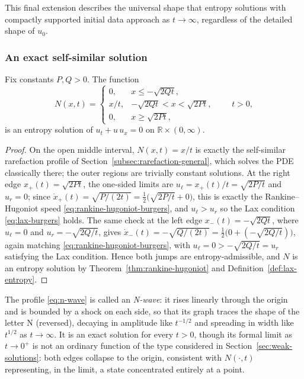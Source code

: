 This final extension describes the universal shape that entropy
solutions with compactly supported initial data approach as $t \to
\infty$, regardless of the detailed shape of $u_0$.

\subsubsection{An exact self-similar solution}
\label{subsubsec:n-wave-exact}

\begin{proposition}
\label{prop:n-wave-exact}
Fix constants $P, Q > 0$. The function
\begin{equation}
  \label{eq:n-wave}
  N(x,t) = \begin{cases}
    0, & x \le -\sqrt{2Qt}, \\
    x/t, & -\sqrt{2Qt} < x < \sqrt{2Pt}, \\
    0, & x \ge \sqrt{2Pt},
  \end{cases}
  \qquad t>0,
\end{equation}
is an entropy solution of $u_t+u\,u_x=0$ on $\mathbb{R}\times(0,\infty)$.
\end{proposition}

\begin{proof}
On the open middle interval, $N(x,t)=x/t$ is exactly the self-similar
rarefaction profile of Section~\ref{subsec:rarefaction-general}, which
solves the PDE classically there; the outer regions are trivially
constant solutions. At the right edge $x_+(t)=\sqrt{2Pt}$, the one-sided
limits are $u_\ell = x_+(t)/t = \sqrt{2P/t}$ and $u_r=0$; since
$\dot x_+(t) = \sqrt{P/(2t)} = \tfrac12\big(\sqrt{2P/t}+0\big)$, this is
exactly the Rankine--Hugoniot speed \eqref{eq:rankine-hugoniot-burgers},
and $u_\ell > u_r$ so the Lax condition \eqref{eq:lax-burgers} holds. The
same check at the left edge $x_-(t)=-\sqrt{2Qt}$, where $u_\ell=0$ and
$u_r=-\sqrt{2Q/t}$, gives $\dot x_-(t) = -\sqrt{Q/(2t)} =
\tfrac12\big(0+(-\sqrt{2Q/t})\big)$, again matching
\eqref{eq:rankine-hugoniot-burgers}, with $u_\ell=0>-\sqrt{2Q/t}=u_r$
satisfying the Lax condition. Hence both jumps are entropy-admissible,
and $N$ is an entropy solution by Theorem~\ref{thm:rankine-hugoniot} and
Definition~\ref{def:lax-entropy}.
\end{proof}

The profile \eqref{eq:n-wave} is called an \emph{N-wave}: it rises
linearly through the origin and is bounded by a shock on each side, so
that its graph traces the shape of the letter N (reversed), decaying in
amplitude like $t^{-1/2}$ and spreading in width like $t^{1/2}$ as
$t\to\infty$. It is an exact solution for every $t>0$, though its formal
limit as $t\to0^+$ is not an ordinary function of the type considered in
Section~\ref{sec:weak-solutions}: both edges collapse to the origin,
consistent with $N(\cdot,t)$ representing, in the limit, a state
concentrated entirely at a point.

